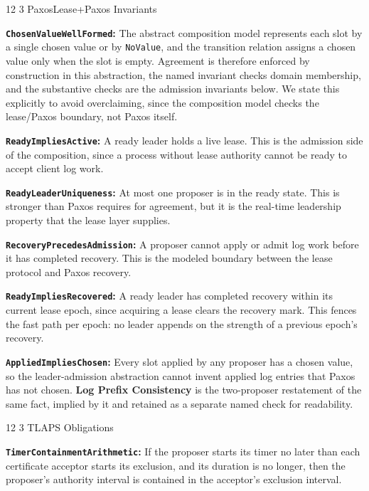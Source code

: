 \documentclass[final,5p,times,twocolumn,number]{elsarticle}
\makeatletter
\newcommand{\code}[1]{\texttt{#1}}
\newcommand{\invitem}[1]{\smallskip\noindent\textbf{#1:} }
\renewcommand\subsection{\@startsection{subsection}{2}{\z@}%
           {12\p@ \@plus 6\p@ \@minus 3\p@}%
           {3\p@ \@plus 6\p@ \@minus 3\p@}%
           {\normalfont\normalsize\bfseries}}
\makeatother
\begin{document}
\subsection{PaxosLease+Paxos Invariants}

\invitem{\code{ChosenValueWellFormed}}The abstract composition model represents each slot by a single chosen value or by \code{NoValue}, and the transition relation assigns a chosen value only when the slot is empty.  Agreement is therefore enforced by construction in this abstraction, the named invariant checks domain membership, and the substantive checks are the admission invariants below.  We state this explicitly to avoid overclaiming, since the composition model checks the lease/Paxos boundary, not Paxos itself.

\invitem{\code{ReadyImpliesActive}}A ready leader holds a live lease.  This is the admission side of the composition, since a process without lease authority cannot be ready to accept client log work.

\invitem{\code{ReadyLeaderUniqueness}}At most one proposer is in the ready state.  This is stronger than Paxos requires for agreement, but it is the real-time leadership property that the lease layer supplies.

\invitem{\code{RecoveryPrecedesAdmission}}A proposer cannot apply or admit log work before it has completed recovery.  This is the modeled boundary between the lease protocol and Paxos recovery.

\invitem{\code{ReadyImpliesRecovered}}A ready leader has completed recovery within its current lease epoch, since acquiring a lease clears the recovery mark.  This fences the fast path per epoch: no leader appends on the strength of a previous epoch's recovery.

\invitem{\code{AppliedImpliesChosen}}Every slot applied by any proposer has a chosen value, so the leader-admission abstraction cannot invent applied log entries that Paxos has not chosen.  \textbf{Log Prefix Consistency} is the two-proposer restatement of the same fact, implied by it and retained as a separate named check for readability.

\subsection{TLAPS Obligations}

\invitem{\code{TimerContainmentArithmetic}}If the proposer starts its timer no later than each certificate acceptor starts its exclusion, and its duration is no longer, then the proposer's authority interval is contained in the acceptor's exclusion interval.
\end{document}
